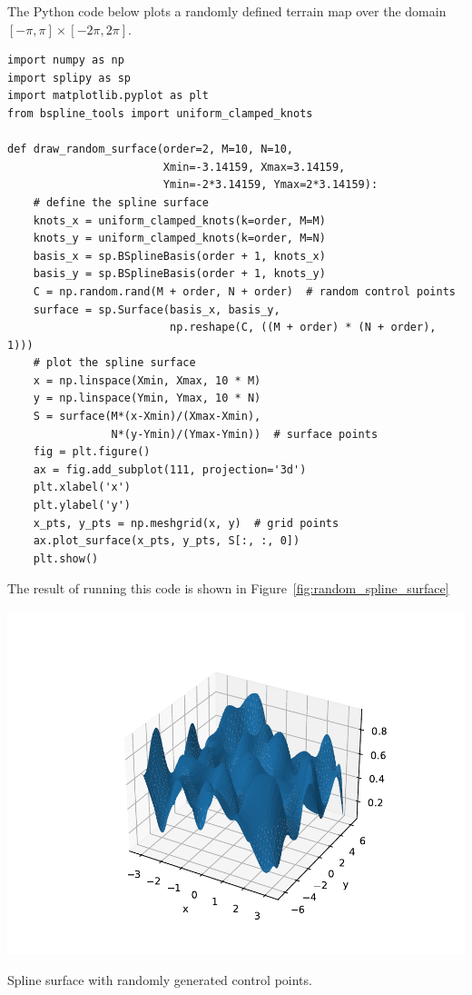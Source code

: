 The Python code below plots a randomly defined terrain map over the domain $[-\pi, \pi]\times[-2\pi, 2\pi]$.
\begin{lstlisting}
import numpy as np
import splipy as sp
import matplotlib.pyplot as plt
from bspline_tools import uniform_clamped_knots

def draw_random_surface(order=2, M=10, N=10,
                        Xmin=-3.14159, Xmax=3.14159,
                        Ymin=-2*3.14159, Ymax=2*3.14159):
    # define the spline surface
    knots_x = uniform_clamped_knots(k=order, M=M)
    knots_y = uniform_clamped_knots(k=order, M=N)
    basis_x = sp.BSplineBasis(order + 1, knots_x)
    basis_y = sp.BSplineBasis(order + 1, knots_y)
    C = np.random.rand(M + order, N + order)  # random control points
    surface = sp.Surface(basis_x, basis_y,
                         np.reshape(C, ((M + order) * (N + order), 1)))
    # plot the spline surface
    x = np.linspace(Xmin, Xmax, 10 * M)
    y = np.linspace(Ymin, Ymax, 10 * N)
    S = surface(M*(x-Xmin)/(Xmax-Xmin),
                N*(y-Ymin)/(Ymax-Ymin))  # surface points
    fig = plt.figure()
    ax = fig.add_subplot(111, projection='3d')
    plt.xlabel('x')
    plt.ylabel('y')
    x_pts, y_pts = np.meshgrid(x, y)  # grid points
    ax.plot_surface(x_pts, y_pts, S[:, :, 0])
    plt.show()
\end{lstlisting}
The result of running this code is shown in Figure~\ref{fig:random_spline_surface}
\begin{marginfigure}[0in]
  \includegraphics[width=\linewidth]{./chap5_trajectory_planning/figures/random_spline_surface}
  \caption{Spline surface with randomly generated control points.}
  \label{fig:random_spline_surface}  
\end{marginfigure}




